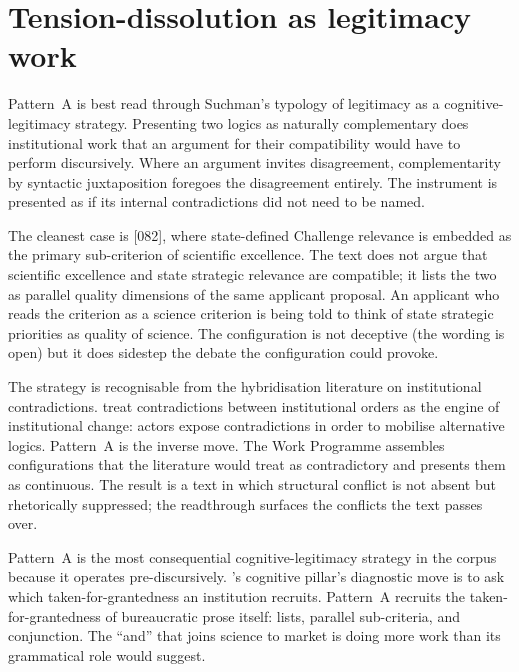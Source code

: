 \section{Tension-dissolution as legitimacy work}
\label{sec:disc-tension}

Pattern~A is best read through Suchman's typology of legitimacy as a
cognitive-legitimacy strategy. Presenting two logics as naturally
complementary does institutional work that an argument for their
compatibility would have to perform discursively. Where an argument
invites disagreement, complementarity by syntactic juxtaposition
foregoes the disagreement entirely. The instrument is presented as if
its internal contradictions did not need to be named.

The cleanest case is [082], where state-defined Challenge relevance is
embedded as the primary sub-criterion of scientific excellence. The
text does not argue that scientific excellence and state strategic
relevance are compatible; it lists the two as parallel quality
dimensions of the same applicant proposal. An applicant who reads the
criterion as a science criterion is being told to think of state
strategic priorities as quality of science. The configuration is not
deceptive (the wording is open) but it does sidestep the debate the
configuration could provoke.

The strategy is recognisable from the hybridisation literature on
institutional contradictions. \textcite{friedland1991bringing} treat
contradictions between institutional orders as the engine of
institutional change: actors expose contradictions in order to
mobilise alternative logics. Pattern~A is the inverse move. The Work
Programme assembles configurations that the literature would treat as
contradictory and presents them as continuous. The result is a text in
which structural conflict is not absent but rhetorically suppressed;
the readthrough surfaces the conflicts the text passes over.

Pattern~A is the most consequential cognitive-legitimacy strategy in
the corpus because it operates pre-discursively.
\textcite{scott2014institutions}'s cognitive pillar's diagnostic move
is to ask which taken-for-grantedness an institution recruits.
Pattern~A recruits the taken-for-grantedness of bureaucratic prose
itself: lists, parallel sub-criteria, and conjunction. The
\enquote{and} that joins science to market is doing more work than its
grammatical role would suggest.


